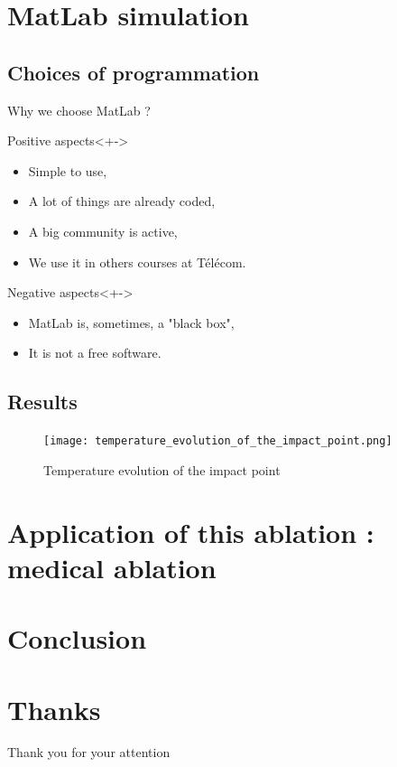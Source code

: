 \documentclass[11pt]{beamer}
\begin{document}
\section{MatLab simulation}

\subsection{Choices of programmation}
\begin{frame}{Why we choose MatLab ?}
\begin{block}{Positive aspects}<+->
\begin{itemize}
\item<+-> Simple to use,
\item<+-> A lot of things are already coded,
\item<+-> A big community is active,
\item<+-> We use it in others courses at Télécom.
\end{itemize}
\end{block}

\begin{block}{Negative aspects}<+->
\begin{itemize}
\item<+-> MatLab is, sometimes, a "black box",
\item<+-> It is not a free software.
\end{itemize}
\end{block}
\end{frame}


\subsection{Results}
\begin{frame}

\begin{figure}[H]
\centering
\texttt{[image: temperature\_evolution\_of\_the\_impact\_point.png]}
\caption{Temperature evolution of the impact point}
\end{figure}

\end{frame}

\begin{frame}

\end{frame}

\section{Application of this ablation : medical ablation}
\begin{frame}

\end{frame}

\section{Conclusion}

\begin{frame}

\end{frame}

\section*{Thanks}
\begin{frame}
\center
\huge{Thank you for your attention}
\end{frame}
\end{document}
